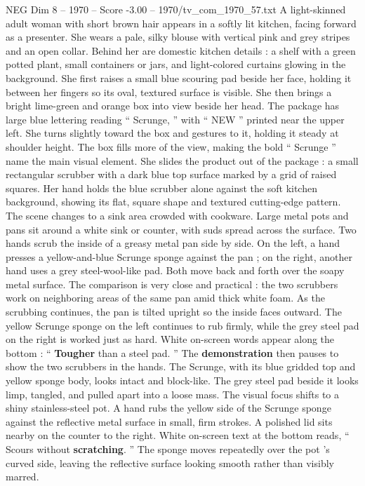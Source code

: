 \begin{textsample}{NEG Dim 8 – 1970 – Score -3.00 – 1970/tv\_com\_1970\_57.txt}  \label{ex:f8_neg_062}
A light-skinned adult woman with short brown hair appears in a softly lit kitchen, facing forward as a presenter.
She wears a pale, silky blouse with vertical pink and grey stripes and an open collar.
Behind her are domestic kitchen details : a shelf with a green potted plant, small containers or jars, and light-colored curtains glowing in the background.
She first raises a small blue scouring pad beside her face, holding it between her fingers so its oval, textured surface is visible.
She then brings a bright lime-green and orange box into view beside her head.
The package has large blue lettering reading “ Scrunge, ” with “ NEW ” printed near the upper left.
She turns slightly toward the box and gestures to it, holding it steady at shoulder height.
The box fills more of the view, making the bold “ Scrunge ” name the main visual element.
She slides the product out of the package : a small rectangular scrubber with a dark blue top surface marked by a grid of raised squares.
Her hand holds the blue scrubber alone against the soft kitchen background, showing its flat, square shape and textured cutting-edge pattern.
The scene changes to a sink area crowded with cookware.
Large metal pots and pans sit around a white sink or counter, with suds spread across the surface.
Two hands scrub the inside of a greasy metal pan side by side.
On the left, a hand presses a yellow-and-blue Scrunge sponge against the pan ; on the right, another hand uses a grey steel-wool-like pad.
Both move back and forth over the soapy metal surface.
The comparison is very close and practical : the two scrubbers work on neighboring areas of the same pan amid thick white foam.
As the scrubbing continues, the pan is tilted upright so the inside faces outward.
The yellow Scrunge sponge on the left continues to rub firmly, while the grey steel pad on the right is worked just as hard.
White on-screen words appear along the bottom : “ \textbf{Tougher} than a steel pad. ” The \textbf{demonstration} then pauses to show the two scrubbers in the hands.
The Scrunge, with its blue gridded top and yellow sponge body, looks intact and block-like.
The grey steel pad beside it looks limp, tangled, and pulled apart into a loose mass.
The visual focus shifts to a shiny stainless-steel pot.
A hand rubs the yellow side of the Scrunge sponge against the reflective metal surface in small, firm strokes.
A polished lid sits nearby on the counter to the right.
White on-screen text at the bottom reads, “ Scours without \textbf{scratching}. ” The sponge moves repeatedly over the pot ’s curved side, leaving the reflective surface looking smooth rather than visibly marred.

\end{textsample}
